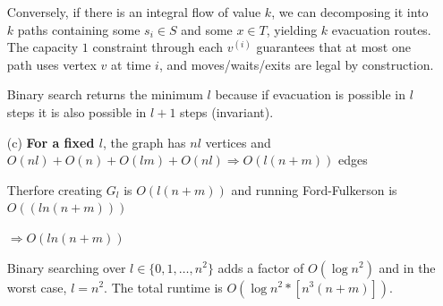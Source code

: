 \documentclass[12pt]{article}
\begin{document}
\begin{enumerate}
Conversely, if there is an integral flow of value $k$, we can decomposing it into $k$ paths containing some $s_i \in S$ and some $x \in T$, yielding $k$ evacuation routes. The capacity $1$ constraint through each $v^{(i)}$ guarantees that at most one path uses vertex
$v$ at time $i$, and moves/waits/exits are legal by construction.

Binary search returns the minimum $l$ because if evacuation is possible in $l$ steps it is also possible in $l+1$ steps (invariant).

\item[(c)]
\textbf{For a fixed $l$}, the graph has $nl$ vertices and $O(nl) + O(n) + O(lm) + O(nl) \Rightarrow O(l(n+m))$ edges

Therfore creating $G_l$ is $O(l(n+m))$ and running Ford-Fulkerson is $O((ln(n+m)))$

$\Rightarrow O(ln(n+m))$


Binary searching over $l \in\{0,1,\dots,n^2\}$ adds a factor of $O(\log n^2)$ and in the worst case, $l = n^2$. The total runtime is $O(\log n^2 * [n^3(n+m)])$.
\end{enumerate}
\end{document}
